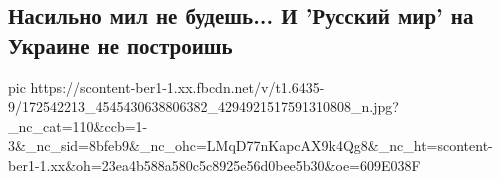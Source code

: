  
 
 
 
 

\subsection{Насильно мил не будешь... И 'Русский мир' на Украине не построишь}

\ifcmt
  pic https://scontent-ber1-1.xx.fbcdn.net/v/t1.6435-9/172542213_4545430638806382_4294921517591310808_n.jpg?_nc_cat=110&ccb=1-3&_nc_sid=8bfeb9&_nc_ohc=LMqD77nKapcAX9k4Qg8&_nc_ht=scontent-ber1-1.xx&oh=23ea4b588a580c5c8925e56d0bee5b30&oe=609E038F
\fi

